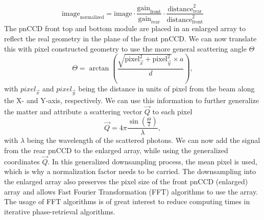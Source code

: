 \begin{equation}
\text{image}_{\text{normalized}} = \text{image}\cdot \frac{\text{gain}_{\text{front}}}{\text{gain}_{\text{rear}}} \cdot \frac{\text{distance}_{\text{rear}}^{2}}{\text{distance}_{\text{front}}^{2}}
\end{equation}
The pnCCD front top and bottom module are placed in an enlarged array to reflect the real geometry in the plane of the front pnCCD. We can now translate this with pixel constructed geometry to use the more general scattering angle $\Theta$
\begin{equation}
\Theta = \arctan\left(\frac{\sqrt{\text{pixel}_{\vec{x}}^{2}+\text{pixel}_{\vec{y}}^{2}}\times a}{d}\right),
\label{eqn:scattering-angle}
\end{equation}
with $pixel_{\vec{x}}$ and $pixel_{\vec{y}}$ being the distance in units of pixel from the beam along the X- and Y-axis, respectively. We can use this information to further generalize the matter and attribute a scattering vector $\vec{Q}$ to each pixel
\begin{equation}
\vec{Q} = 4 \pi \frac{\sin\left(\frac{\Theta}{2}\right)}{\lambda},
\label{eqn:q-vector}
\end{equation}
with $\lambda$ being the wavelength of the scattered photons. We can now add the signal from the rear pnCCD to the enlarged array, while using the generalized coordinates $\vec{Q}$. In this generalized downsampling process, the mean pixel is used, which is why a normalization factor needs to be carried. The downsampling into the enlarged array also  preserves the pixel size of the front pnCCD (enlarged) array and allows Fast Fourier Transformation (FFT) algorithms to use the array. The usage of FFT algorithms is of great interest to reduce computing times in iterative phase-retrieval algorithms.\\
%
%
%

